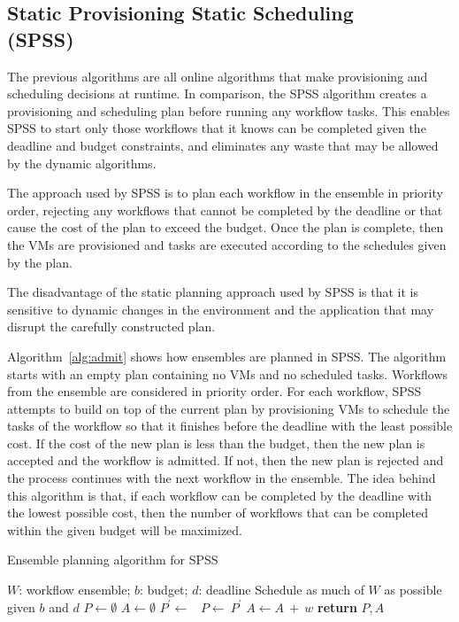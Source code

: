 \documentclass{sig-alternate}
\begin{document}
\subsection{Static Provisioning Static Scheduling \\(SPSS)}

The previous algorithms are all online algorithms that make provisioning 
and scheduling decisions at runtime. In comparison, the SPSS algorithm 
creates a provisioning and scheduling plan before running any workflow tasks.
This enables SPSS to start only those workflows that it knows can be completed
given the deadline and budget constraints, and eliminates any waste that may
be allowed by the dynamic algorithms.

The approach used by SPSS is to plan each workflow in the ensemble in priority 
order, rejecting any workflows that cannot be completed by the deadline or that 
cause the cost of the plan to exceed the budget. Once the plan is complete, then 
the VMs are provisioned and tasks are executed according to the schedules given
by the plan.

The disadvantage of the static planning approach used by SPSS is that it is 
sensitive to dynamic changes in the environment and the application that may 
disrupt the carefully constructed plan.

Algorithm~\ref{alg:admit} shows how ensembles are planned in SPSS. The algorithm
starts with an empty plan containing no VMs and no scheduled tasks. Workflows
from the ensemble are considered in priority order. For each workflow, SPSS
attempts to build on top of the current plan by provisioning VMs to schedule 
the tasks of the workflow so that it finishes before the deadline with the least
possible cost. If the cost of the new plan is less than the budget, then the 
new plan is accepted and the workflow is admitted. If not, then the new plan is 
rejected and the process continues with the next workflow in the ensemble. The 
idea behind this algorithm is that, if each workflow can be completed by the 
deadline with the lowest possible cost, then the number of workflows that can 
be completed within the given budget will be maximized.

\begin{algorithm}
\caption{Ensemble planning algorithm for SPSS}
\label{alg:admit}
\begin{algorithmic}[1]
\Require $W$: workflow ensemble; $b$: budget; $d$: deadline
\Ensure Schedule as much of $W$ as possible given $b$ and $d$
    \State $P\gets \emptyset$ 
    \State $A\gets \emptyset$ 
        \State $P^\prime \gets$\ 
            \State $P\gets\ P^\prime$ 
            \State $A \gets A\ +\ w$ 
        \EndIf
    \EndFor
    \State \textbf{return} $P,A$
\EndProcedure
\end{algorithmic}
\end{algorithm}
\end{document}
